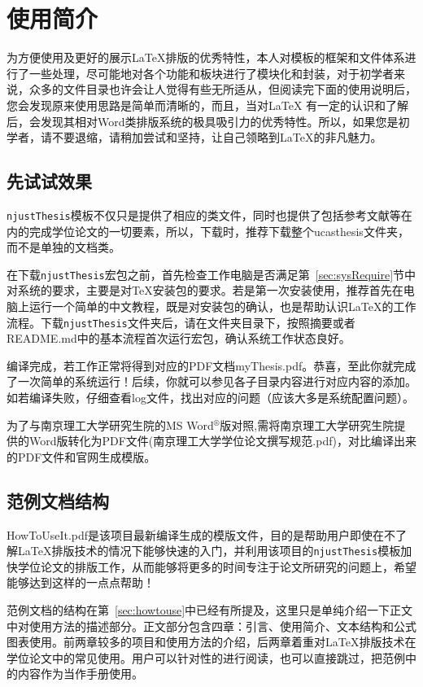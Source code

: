 
\chapter{使用简介}
\label{chap:guide}

为方便使用及更好的展示\LaTeX{}排版的优秀特性，本人对模板的框架和文件体系进行了一些处理，尽可能地对各个功能和板块进行了模块化和封装，对于初学者来说，众多的文件目录也许会让人觉得有些无所适从，但阅读完下面的使用说明后，您会发现原来使用思路是简单而清晰的，而且，当对\LaTeX{} 有一定的认识和了解后，会发现其相对Word类排版系统的极具吸引力的优秀特性。所以，如果您是初学者，请不要退缩，请稍加尝试和坚持，让自己领略到\LaTeX{}的非凡魅力。

\section{先试试效果}

\texttt{njustThesis}模板不仅只是提供了相应的类文件，同时也提供了包括参考文献等在内的完成学位论文的一切要素，所以，下载时，推荐下载整个ucasthesis文件夹，而不是单独的文档类。

在下载\texttt{njustThesis}宏包之前，首先检查工作电脑是否满足第~\ref{sec:sysRequire}节中对系统的要求，主要是对\TeX{}安装包的要求。若是第一次安装使用，推荐首先在电脑上运行一个简单的中文教程，既是对安装包的确认，也是帮助认识\LaTeX{}的工作流程。下载\texttt{njustThesis}文件夹后，请在文件夹目录下，按照摘要或者README.md中的基本流程首次运行宏包，确认系统工作状态良好。

编译完成，若工作正常将得到对应的PDF文档myThesis.pdf。恭喜，至此你就完成了一次简单的系统运行！后续，你就可以参见各子目录内容进行对应内容的添加。如若编译失败，仔细查看log文件，找出对应的问题（应该大多是系统配置问题）。

为了与南京理工大学研究生院的MS Word$^{\circledR}$版对照,需将南京理工大学研究生院提供的Word版转化为PDF文件(南京理工大学学位论文撰写规范.pdf)，对比编译出来的PDF文件和官网生成模版。

\section{范例文档结构}
\label{sec:example}

HowToUseIt.pdf是该项目最新编译生成的模版文件，目的是帮助用户即使在不了解\LaTeX{}排版技术的情况下能够快速的入门，并利用该项目的\texttt{njustThesis}模板加快学位论文的排版工作，从而能够将更多的时间专注于论文所研究的问题上，希望能够达到这样的一点点帮助！

范例文档的结构在第~\ref{sec:howtouse}中已经有所提及，这里只是单纯介绍一下正文中对使用方法的描述部分。正文部分包含四章：引言、使用简介、文本结构和公式图表使用。前两章较多的项目和使用方法的介绍，后两章着重对\LaTeX{}排版技术在学位论文中的常见使用。用户可以针对性的进行阅读，也可以直接跳过，把范例中的内容作为当作手册使用。




